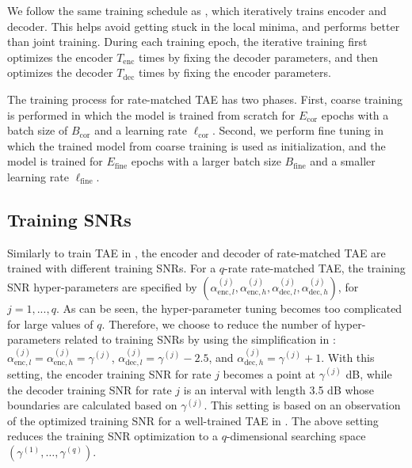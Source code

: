 \documentclass [PhD] {uclathes}
\begin{document}
We follow the same training schedule as \cite{jiang2019turbo}, which iteratively trains encoder and decoder. This helps avoid getting stuck in the local minima, and performs better than joint training. During each training epoch, the iterative training first optimizes the encoder $T_{\text{enc}}$ times by fixing the decoder parameters, and then optimizes the decoder $T_{\text{dec}}$ times by fixing the encoder parameters.

The training process for rate-matched TAE has two phases. First, coarse training is performed in which the model is trained from scratch for $E_{\text{cor}}$ epochs with a batch size of $B_{\text{cor}}$ and a learning rate $\ell_{\text{cor}}$. Second, we perform fine tuning in which the trained model from coarse training is used as initialization, and the model is trained for $E_{\text{fine}}$ epochs with a larger batch size $B_{\text{fine}}$ and a smaller learning rate $\ell_{\text{fine}}$.


\subsection{Training SNRs}
Similarly to train TAE in \cite{jiang2019turbo}, the encoder and decoder of rate-matched TAE are trained with different training SNRs. 
For a $q$-rate rate-matched TAE, the training SNR hyper-parameters are specified by $(\alpha^{(j)}_{\text{enc},l},\alpha^{(j)}_{\text{enc},h},\alpha^{(j)}_{\text{dec},l},\alpha^{(j)}_{\text{dec},h})$, for $j=1,...,q$. 
As can be seen, the hyper-parameter tuning becomes too complicated for large values of $q$. 
Therefore, we choose to reduce the number of hyper-parameters related to training SNRs by using the simplification in \cite{jamali_productae}: 
$\alpha^{(j)}_{\text{enc},l}=\alpha^{(j)}_{\text{enc},h}=\gamma^{(j)}$, $\alpha^{(j)}_{\text{dec},l}=\gamma^{(j)}-2.5$, and $\alpha^{(j)}_{\text{dec},h}=\gamma^{(j)}+1$.
With this setting, the encoder training SNR for rate $j$ becomes a point at $\gamma^{(j)}$ dB, while the decoder training SNR for rate $j$ is an interval with length 3.5 dB whose boundaries are calculated based on $\gamma^{(j)}$. This setting is based on an observation of the optimized training SNR for a well-trained TAE in \cite{jiang2019turbo}. The above setting reduces the training SNR optimization to a $q$-dimensional searching space $\left(\gamma^{(1)},\ldots, \gamma^{(q)}\right)$.
\end{document}
